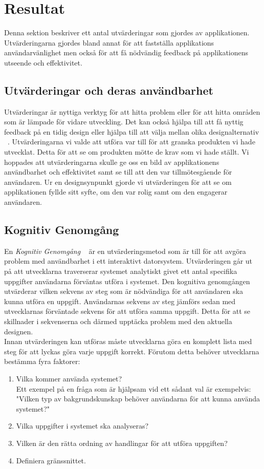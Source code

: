 \documentclass[a4paper, 11pt]{article}
\begin{document}
\section{Resultat}
Denna sektion beskriver ett antal utvärderingar som gjordes av applikationen. Utvärderingarna gjordes bland annat för att fastställa applikations användarvänlighet men också för att få nödvändig feedback på applikationens utseende och effektivitet.  

\subsection{Utvärderingar och deras användbarhet}
Utvärderingar är nyttiga verktyg för att hitta problem eller för att hitta områden som är lämpade för vidare utveckling. Det kan också hjälpa till att få nyttig feedback på en tidig design eller hjälpa till att välja mellan olika designalternativ ~\cite[sid 226--228]{benyon2010designing}. Utvärderingarna vi valde att utföra var till för att granska produkten vi hade utvecklat. Detta för att se om produkten mötte de krav som vi hade ställt. Vi hoppades att utvärderingarna skulle ge oss en bild av applikationens användbarhet och effektivitet samt se till att den var tillmötesgående för användaren. Ur en designsynpunkt gjorde vi utvärderingen för att se om applikationen fyllde sitt syfte, om den var rolig samt om den engagerar användaren.

\subsection{Kognitiv Genomgång}
En \textit{Kognitiv Genomgång} ~\cite[sid 2--8]{cognitive} är en utvärderingsmetod som är till för att avgöra problem med användbarhet i ett interaktivt datorsystem. Utvärderingen går ut på att utvecklarna traverserar systemet analytiskt givet ett antal specifika uppgifter användarna förväntas utföra i systemet. Den kognitiva genomgången utvärderar vilken sekvens av steg som är nödvändiga för att användaren ska kunna utföra en uppgift. Användarnas sekvens av steg jämförs sedan med utvecklarnas förväntade sekvens för att utföra samma uppgift. Detta för att se skillnader i sekvenserna och därmed upptäcka problem med den aktuella designen.\\
Innan utvärderingen kan utföras måste utvecklarna göra en komplett lista med steg för att lyckas göra varje uppgift korrekt. Förutom detta behöver utvecklarna bestämma fyra faktorer:
\begin{enumerate}
\item Vilka kommer använda systemet?\\
Ett exempel på en fråga som är hjälpsam vid ett sådant val är exempelvis: "Vilken typ av bakgrundskunskap behöver användarna för att kunna använda systemet?"
\item Vilka uppgifter i systemet ska analyseras?
\item Vilken är den rätta ordning av handlingar för att utföra uppgiften?
\item Definiera gränssnittet.
\end{enumerate}
\end{document}
